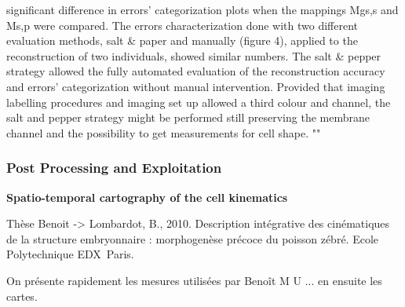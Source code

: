 significant difference in errors’ categorization plots when the mappings Mgs,s and Ms,p were compared. The errors characterization done with two different evaluation methods, salt & paper and manually (figure 4), applied to the reconstruction of two individuals, showed similar numbers. The salt & pepper strategy allowed the fully automated evaluation of the reconstruction accuracy and errors’ categorization without manual intervention.  Provided that imaging labelling procedures and imaging set up allowed a third colour and channel, the salt and pepper strategy might be performed still preserving the membrane channel and the possibility to get measurements for cell shape.  ""      

\subsubsection{Post Processing and Exploitation  }

\textbf{Spatio-temporal cartography of the cell kinematics}

   Thèse Benoit -> Lombardot, B., 2010. Description intégrative des cinématiques de la structure embryonnaire : morphogenèse précoce du poisson zébré. Ecole Polytechnique EDX Paris. \cite{Lombardot:2010vd}

  On présente rapidement les mesures utilisées par Benoît M U ... en ensuite les cartes.  


